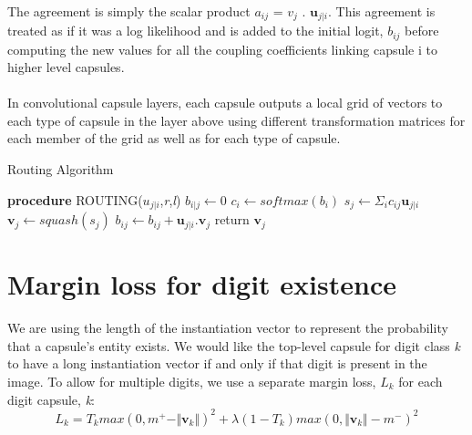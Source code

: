\documentclass[a4paper,12pt]{report}
\begin{document}
\paragraph{}
The agreement is simply the scalar product $a_{ij}$ = $v_j$ . $\textbf{u}_{j|i}$. This agreement is treated as if it was a log
likelihood and is added to the initial logit, $b_{ij}$ before computing the new values for all the coupling coefficients linking capsule i to higher level capsules.

\paragraph{}
In convolutional capsule layers, each capsule outputs a local grid of vectors to each type of capsule in
the layer above using different transformation matrices for each member of the grid as well as for
each type of capsule.

\begin{algorithm}
\caption {Routing Algorithm}
\BlankLine
\textbf{procedure} ROUTING(\textbf{$u_{j|i}$},\textit{r},\textit{l})
\;
	{ $ b_{i|j} \leftarrow 0$ \; }
		{ 
			{ $c_i \leftarrow softmax(b_i)$
			}
		 { $ s_{j} \leftarrow \Sigma_i c_{ij}\textbf{u}_{j|i}$
		 }
		 { $ \textbf{v}_j \leftarrow squash(s_j)$ 
		 }
		 { $b_{ij} \leftarrow b_{ij} + \textbf{u}_{j|i}.\textbf{v}_j $
		 }
		 return $\textbf{v}_j$
		}
\end{algorithm}

\section{Margin loss for digit existence}
We are using the length of the instantiation vector to represent the probability that a capsule's entity exists. We would like the top-level capsule for digit class \textit{k} to have a long instantiation vector if and only if that digit is present in the image. To allow for multiple digits, we use a separate margin loss, $L_k$ for each digit capsule, \textit{k}:
\begin{equation}
L_k = T_k max(0, m^{+} - \Vert \textbf{v}_k \Vert)^2 + \lambda(1 - T_k) max(0, \Vert \textbf{v}_k \Vert - m^{-})^2
\end{equation}
\end{document}
